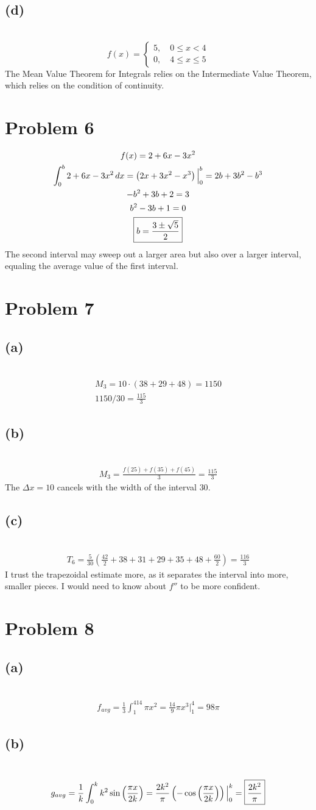 \documentclass[12pt]{article}
\newcommand*{\paren}[1]{\ensuremath\left(#1\right)}
\newcommand{\vem}{\vspace{0.5em}}
\newcommand{\problem}[1]{\section{Problem #1}}
\newcommand{\subproblem}[1]{\subsection{(#1)} \,}
\begin{document}
\subproblem{d}
\[
f(x)=\begin{cases}
    5, \quad 0\le x<4\\
    0, \quad 4\le x\le 5
\end{cases}
\]
The Mean Value Theorem for Integrals relies on the Intermediate Value Theorem, which relies on the condition of continuity.

\problem{6}
\begin{gather*}
    f(x)=2+6x-3x^2\\
    \int_0^b2+6x-3x^2\, dx=\paren{2x+3x^2-x^3}\Big|^b_0=2b+3b^2-b^3\\
    -b^2+3b+2=3\\
    b^2-3b+1=0\\
    \boxed{b=\frac{3\pm \sqrt{5}}{2}}
\end{gather*}
The second interval may sweep out a larger area but also over a larger interval, equaling the average value of the first interval. \vem

\problem{7}

\subproblem{a}
\begin{gather*}
    M_3=10\cdot (38+29+48)=1150\\
    1150/30=\boxed{\frac{115}{3}}
\end{gather*}

\subproblem{b}
\begin{gather*}
    M_3=\frac{f(25)+f(35)+f(45)}{3}=\frac{115}{3}
\end{gather*}
The $\Delta x=10$ cancels with the width of the interval $30$.\vem

\subproblem{c}
\begin{gather*}
    T_6=\frac{5}{30}(\frac{42}{2}+38+31+29+35+48+\frac{60}{2})=\boxed{\frac{116}{3}}
\end{gather*}
I trust the trapezoidal estimate more, as it separates the interval into more, smaller pieces. I would need to know about $f''$ to be more confident. 

\problem{8}

\subproblem{a}
\begin{gather*}
    f_{avg}=\frac{1}{3}\int_1^414\pi x^2=\frac{14}{9}\pi x^3 \Big|^4_1=\boxed{98\pi}
\end{gather*}

\subproblem{b}
\begin{gather*}
    g_{avg}=\frac{1}{k}\int_0^k k^2\sin \paren{\frac{\pi x}{2k}}=\frac{2k^2}{\pi} \paren{-\cos \paren{\frac{\pi x}{2k}}}\Big|^k_0=\boxed{\frac{2k^2}{\pi}}
\end{gather*}
\end{document}
